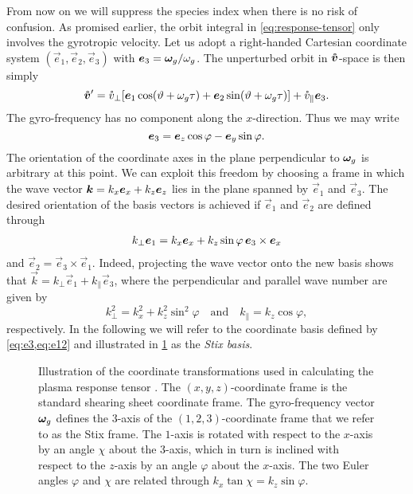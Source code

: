 \documentclass[aps,pre,notitlepage,amsmath,amssymb,amsfonts,nobibnotes,nofootinbib]{revtex4-1}
\begin{document}
From now on we will suppress the species index when there is no risk of
confusion. As promised earlier, the orbit integral in
\cref{eq:response-tensor} only involves the gyrotropic velocity. Let us adopt
a right-handed Cartesian coordinate system $(\vec{e}_1,\vec{e}_2,\vec{e}_3)$
with $\bm{e}_3=\bm{\omega}_g/\omega_g$. The unperturbed orbit in $\bm{\mathring{v}}$-space is then
simply
\begin{equation}
  \label{eq:vcirc-tau}
  \vvc' = \vc_\perp[\vec{e}_1\cos(\vartheta + \omg\tau)
  + \vec{e}_2\sin(\vartheta + \omg\tau)] + \vc_\parallel\vec{e}_3.
\end{equation}
The gyro-frequency has no component along the $x$-direction. Thus we may write
\begin{equation}
  \label{eq:e3}
  \vec{e}_3 = \ez\cos\varphi - \ey\sin\varphi.
\end{equation}
The orientation of the coordinate axes in the plane perpendicular to $\bm{\omega}_g$
is arbitrary at this point. We can exploit this freedom by choosing a frame in
which the wave vector $\bm{k}=k_x\bm{e}_x+k_z\bm{e}_z$ lies in the plane spanned by
$\vec{e}_1$ and $\vec{e}_3$. The desired orientation of the basis vectors is
achieved if $\vec{e}_1$ and $\vec{e}_2$ are defined through
\begin{align}
  \label{eq:e12}
  k_\perp\vec{e}_1 = k_x\ex + k_z\sin\varphi\,\vec{e}_3\times\ex
\end{align}
and $\vec{e}_2=\vec{e}_3\times\vec{e}_1$. Indeed, projecting the wave vector
onto the new basis shows that $\vec{k}=k_\perp\vec{e}_1+k_\parallel\vec{e}_3$,
where the perpendicular and parallel wave number are given by
\begin{equation}
  k_\perp^2 = k_x^2 + k_z^2\sin^2\varphi
  \quad\textrm{and}\quad
  k_\parallel = k_z\cos\varphi,
\end{equation}
respectively. In the following we will refer to the coordinate basis defined
by \cref{eq:e3,eq:e12} and illustrated in \cref{fig:stix} as the \emph{Stix
basis}.

\begin{figure}
  \centering
  
  \caption{Illustration of the coordinate transformations
     used in calculating the plasma response tensor
    . The $(x,y,z)$-coordinate frame
    is the standard shearing sheet coordinate frame. The gyro-frequency vector
    $\bm{\omega}_g$ defines the $3$-axis of the $(1,2,3)$-coordinate frame that we
    refer to as the Stix frame. The $1$-axis is rotated with respect to the
    $x$-axis by an angle $\chi$ about the $3$-axis, which in turn is
    inclined with respect to the $z$-axis by an angle $\varphi$ about the
    $x$-axis. The two Euler angles $\varphi$ and $\chi$ are related through
    $k_x\tan\chi=k_z\sin\varphi$.}\label{fig:stix}
\end{figure}
\end{document}
